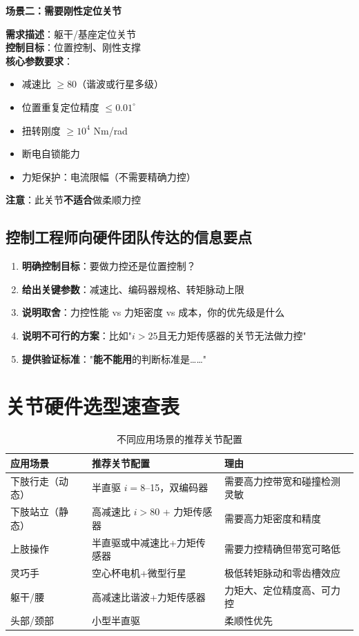 \textbf{场景二：需要刚性定位关节}

\begin{tcolorbox}[colback=lightgray]
\textbf{需求描述}：躯干/基座定位关节\\
\textbf{控制目标}：位置控制、刚性支撑\\
\textbf{核心参数要求}：
\begin{itemize}
  \item 减速比 $\geq 80$（谐波或行星多级）
  \item 位置重复定位精度 $\leq 0.01^\circ$
  \item 扭转刚度 $\geq 10^4$ Nm/rad
  \item 断电自锁能力
  \item 力矩保护：电流限幅（不需要精确力控）
\end{itemize}
\textbf{注意}：此关节\textbf{不适合}做柔顺力控
\end{tcolorbox}

\subsection{控制工程师向硬件团队传达的信息要点}

\begin{enumerate}
  \item \textbf{明确控制目标}：要做力控还是位置控制？
  \item \textbf{给出关键参数}：减速比、编码器规格、转矩脉动上限
  \item \textbf{说明取舍}：力控性能 vs 力矩密度 vs 成本，你的优先级是什么
  \item \textbf{说明不可行的方案}：比如"$i > 25$且无力矩传感器的关节无法做力控"
  \item \textbf{提供验证标准}："\textbf{能不能用}的判断标准是……"
\end{enumerate}

\section{关节硬件选型速查表}

\begin{table}[H]
\centering
\begin{tabular}{p{3.5cm}p{4cm}p{4cm}}
\toprule
\textbf{应用场景} & \textbf{推荐关节配置} & \textbf{理由} \\
\midrule
下肢行走（动态） & 半直驱 $i=8$--15，双编码器 & 需要高力控带宽和碰撞检测灵敏 \\
下肢站立（静态） & 高减速比 $i>80$ + 力矩传感器 & 需要高力矩密度和精度 \\
上肢操作 & 半直驱或中减速比+力矩传感器 & 需要力控精确但带宽可略低 \\
灵巧手 & 空心杯电机+微型行星 & 极低转矩脉动和零齿槽效应 \\
躯干/腰 & 高减速比谐波+力矩传感器 & 力矩大、定位精度高、可力控 \\
头部/颈部 & 小型半直驱 & 柔顺性优先 \\
\bottomrule
\end{tabular}
\caption{不同应用场景的推荐关节配置}
\label{tab:application_config}
\end{table}

